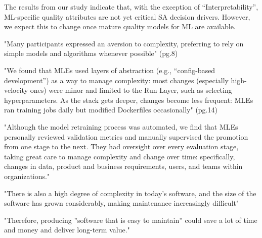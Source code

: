 The results from our study indicate that, with the exception of
“Interpretability”, ML-specific quality attributes are not yet critical SA
decision drivers. However, we expect this to change once mature quality models
for ML are available.


\parencite{Shankar2022OperationalizingStudy}

"Many participants expressed an aversion to complexity, preferring to rely
on simple models and algorithms whenever possible" (pg.8)

"We found that MLEs used layers of abstraction (e.g., “config-based
development”) as a way to manage complexity: most changes (especially
high-velocity ones) were minor and limited to the Run Layer, such as
selecting hyperparameters. As the stack gets deeper, changes become
less frequent: MLEs ran training jobs daily but modified Dockerfiles
occasionally" (pg.14)


\parencite{Shankar2024WeLearning}

"Although the model retraining process was automated, we find that MLEs
personally reviewed validation metrics and manually supervised the promotion
from one stage to the next. They had oversight over every evaluation stage,
taking great care to manage complexity and change over time: specifically,
changes in data, product and business requirements, users, and teams within
organizations."


\parencite{Shivashankar2022MaintainabilityReview}

"There is also a high degree of complexity in today’s software, and the size of
the software has grown considerably, making maintenance increasingly difficult"

"Therefore, producing ”software that is easy to maintain” could save a lot of
time and money and deliver long-term value."

